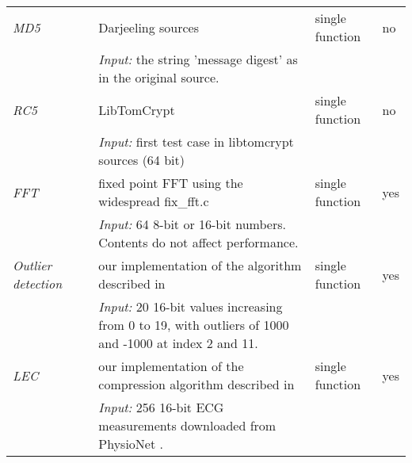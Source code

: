 \begin{table}
\begin{tabular}{llp{}ll}
    \emph{MD5}               & \cite{Brouwers:2009cj, Ellul:2012thesis} & Darjeeling sources                                                                                         & single function  & no \\
                             &                                          & \emph{Input:} the string 'message digest' as in the original source.                                       &                  & \\ %

    \emph{RC5}               &                                          & LibTomCrypt \cite{libtomcrypt}                                                                             & single function  & no \\
                             &                                          & \emph{Input:} first test case in libtomcrypt sources (64 bit)                                              &                  & \\

    \emph{FFT}               & \cite{Kumar:2007ge}                      & fixed point FFT using the widespread fix\_fft.c \cite{sos-operating-system}                                & single function  & yes \\
                             &                                          & \emph{Input:} 64 8-bit or 16-bit numbers. Contents do not affect performance.                              &                  & \\

    \emph{Outlier detection} & \cite{Kumar:2007ge}                      & our implementation of the algorithm described in \cite{Kumar:2007ge}                                       & single function  & yes \\
                             &                                          & \emph{Input:} 20 16-bit values increasing from 0 to 19, with outliers of 1000 and -1000 at index 2 and 11. &                  & \\

    \emph{LEC}               &                                          & our implementation of the compression algorithm described in \cite{Marcelloni:2009ja}                      & single function  & yes \\
                             &                                          & \emph{Input:} 256 16-bit ECG measurements downloaded from PhysioNet \cite{physionet-ecg-data}.             &                  & \\


\end{tabular}
\end{table}
